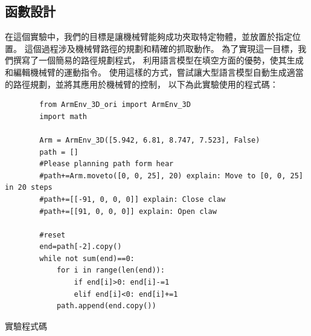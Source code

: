 \documentclass[class=NCU_thesis, crop=false]{standalone}
\begin{document}
\subsection{函數設計}
在這個實驗中，我們的目標是讓機械臂能夠成功夾取特定物體，並放置於指定位置。
這個過程涉及機械臂路徑的規劃和精確的抓取動作。
為了實現這一目標，我們撰寫了一個簡易的路徑規劃程式，
利用語言模型在填空方面的優勢，使其生成和編輯機械臂的運動指令。
使用這樣的方式，嘗試讓大型語言模型自動生成適當的路徑規劃，並將其應用於機械臂的控制，
以下為此實驗使用的程式碼：\\
\begin{listing}[h]
    \begin{verbatim}
        from ArmEnv_3D_ori import ArmEnv_3D
        import math

        Arm = ArmEnv_3D([5.942, 6.81, 8.747, 7.523], False)
        path = []
        #Please planning path form hear
        #path+=Arm.moveto([0, 0, 25], 20) explain: Move to [0, 0, 25] in 20 steps
        #path+=[[-91, 0, 0, 0]] explain: Close claw
        #path+=[[91, 0, 0, 0]] explain: Open claw

        #reset
        end=path[-2].copy()
        while not sum(end)==0:
            for i in range(len(end)):
                if end[i]>0: end[i]-=1
                elif end[i]<0: end[i]+=1
            path.append(end.copy())
    \end{verbatim}
\caption{實驗程式碼} 
\end{listing}
\clearpage
\end{document}
